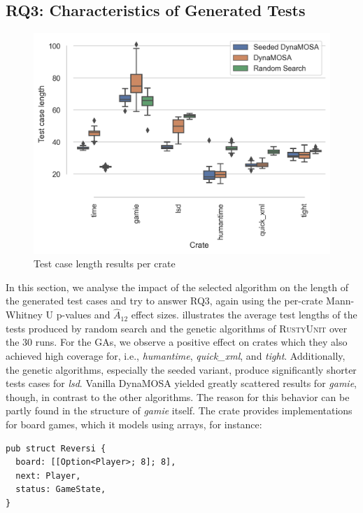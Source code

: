 \documentclass[paper=a4,%
  twoside,%
  BCOR4mm,%
  abstract=true,%
  toc=bibliography,%
  chapterprefix=true,%
  toc=bibliographynumbered,%
  open=right,%
  english,%
  pagesize=pdftex]{scrreprt}
\newcommand{\tech}{\textsc{RustyUnit}\xspace}
\newcommand{\runs}{30\xspace}
\begin{document}
\subsection{RQ3: Characteristics of Generated Tests}
\begin{figure}[ht]
\caption{\label{fig:length-boxplot}Test case length results per crate}
\centering
\includegraphics[width=\textwidth]{experiments/length-boxplot-crates}
\end{figure}
In this section, we analyse the impact of the selected algorithm on the length of the generated test cases and try to answer RQ3, again using the per-crate Mann-Whitney U p-values and $\hat{A}_{12}$ effect sizes.  illustrates the average test lengths of the tests produced by random search and the genetic algorithms of \tech over the \runs runs. For the \acp{GA}, we observe a positive effect on crates which they also achieved high coverage for, i.e., \emph{humantime}, \emph{quick\_xml}, and \emph{tight}. Additionally, the genetic algorithms, especially the seeded variant, produce significantly shorter tests cases for \emph{lsd}. Vanilla DynaMOSA yielded greatly scattered results for \emph{gamie}, though, in contrast to the other algorithms. The reason for this behavior can be partly found in the structure of \emph{gamie} itself. The crate provides implementations for board games, which it models using arrays, for instance:

\begin{lstlisting}[style=boxed, caption={}, label={}, escapechar=§]
pub struct Reversi {
  board: [[Option<Player>; 8]; 8],
  next: Player,
  status: GameState,
}
\end{lstlisting}
\end{document}
